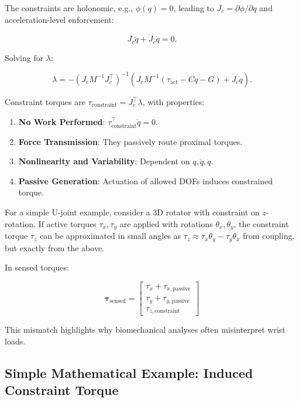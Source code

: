 \documentclass[11pt]{article}
\begin{document}
The constraints are holonomic, e.g., $\phi(q) = 0$, leading to $J_c = \partial \phi / \partial q$ and acceleration-level enforcement:

\begin{equation}
    J_c \ddot{q} + \dot{J}_c \dot{q} = 0.
\end{equation}

Solving for $\lambda$:

\begin{equation}
    \lambda = -(J_c M^{-1} J_c^\top)^{-1} \left( J_c M^{-1} (\tau_{\text{act}} - C\dot{q} - G) + \dot{J}_c \dot{q} \right).
\end{equation}

Constraint torques are $\tau_{\text{constraint}} = J_c^\top \lambda$, with properties:
\begin{enumerate}
    \item \textbf{No Work Performed}: $\tau_{\text{constraint}}^\top \dot{q} = 0$.
    \item \textbf{Force Transmission}: They passively route proximal torques.
    \item \textbf{Nonlinearity and Variability}: Dependent on $q, \dot{q}, \ddot{q}$.
    \item \textbf{Passive Generation}: Actuation of allowed DOFs induces constrained torque.
\end{enumerate}

For a simple U-joint example, consider a 3D rotator with constraint on $z$-rotation. If active torques $\tau_x, \tau_y$ are applied with rotations $\theta_x, \theta_y$, the constraint torque $\tau_z$ can be approximated in small angles as $\tau_z \approx \tau_x \theta_y - \tau_y \theta_x$ from coupling, but exactly from the above.

In sensed torques:

\begin{equation}
\bm{\tau}_{\text{sensed}} = 
\begin{bmatrix}
\tau_x + \tau_{x,\text{passive}} \\
\tau_y + \tau_{y,\text{passive}} \\
\tau_{z,\text{constraint}}
\end{bmatrix}
\end{equation}

This mismatch highlights why biomechanical analyses often misinterpret wrist loads.

\subsection{Simple Mathematical Example: Induced Constraint Torque}
\end{document}
